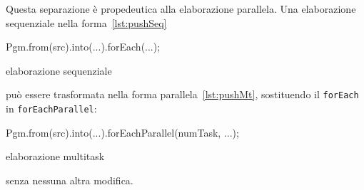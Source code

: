 Questa separazione è propedeutica alla elaborazione parallela.
Una elaborazione sequenziale nella forma~\ref{lst:pushSeq}
\begin{elisting}[!htb]
\begin{javacode}
    Pgm.from(src).into(...).forEach(...);
\end{javacode}
\caption{elaborazione sequenziale}
\label{lst:pushSeq}
\end{elisting}
può essere trasformata nella forma parallela~\ref{lst:pushMt}, sostituendo il
\texttt{forEach} in \texttt{forEachParallel}:
\begin{elisting}[!htb]
\begin{javacode}
    Pgm.from(src).into(...).forEachParallel(numTask, ...);
\end{javacode}
\caption{elaborazione multitask}
\label{lst:pushMt}
\end{elisting}
senza nessuna altra modifica.

